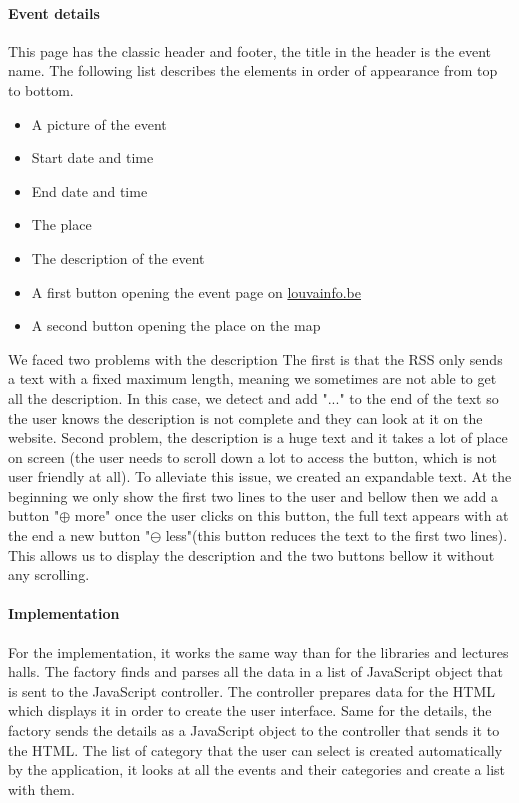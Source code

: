 \documentclass{eplmastersthesis}
\begin{document}
\paragraph{Event details} This page has the classic header and footer, the title in the header is the event name. The following list describes the elements in order of appearance from top to bottom.
\begin{itemize}
\item A picture of the event
\item Start date and time 
\item End date and time
\item The place
\item The description of the event
\item A first button opening the event page on \url{louvainfo.be}
\item A second button opening the place on the map
\end{itemize}
We faced two problems with the description The first is that the RSS only sends a text with a fixed maximum length, meaning we sometimes are not able to get all the description. In this case, we detect and add "..." to the end of the text so the user knows the description is not complete and they can look at it on the website. Second problem, the description is a huge text and it takes a lot of place on screen (the user needs to scroll down a lot to access the button, which is not user friendly at all). To alleviate this issue, we created an expandable text. At the beginning we only show the first two lines to the user and bellow then we add a button "$\oplus$ more" once the user clicks on this button, the full text appears with at the end a new button "$\ominus$ less"(this button reduces the text to the first two lines). This allows us to display the description and the two buttons bellow it without any scrolling.
\paragraph{Implementation}
For the implementation, it works the same way than for the libraries and lectures halls. The factory finds and parses all the data in  a list of JavaScript object that is sent to the JavaScript controller. The controller prepares data for the HTML which displays it in order to create the user interface. Same for the details, the factory sends the details as a JavaScript object to the controller that sends it to the HTML. The list of category that the user can select is created automatically by the application, it looks at all the events and their categories and create a list with them. 
\end{document}
